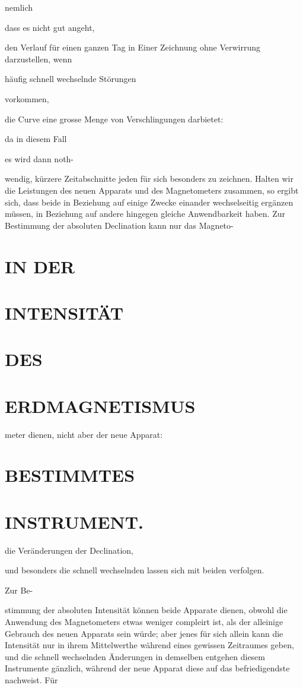 \documentclass[12pt,a4paper]{article}
\begin{document}
nemlich

dass es nicht gut angeht,

den Verlauf für einen ganzen Tag in Einer Zeichnung ohne Verwirrung darzustellen, wenn

häufig schnell wechselnde Störungen

vorkommen,

die Curve eine grosse Menge von Verschlingungen darbietet:

da in diesem Fall

es wird dann noth-

wendig, kürzere Zeitabschnitte jeden für sich besonders zu zeichnen. Halten wir die Leistungen des neuen Apparats und des Magnetometers zusammen, so ergibt sich, dass beide in Beziehung auf einige Zwecke einander wechselseitig ergänzen müssen, in Beziehung auf andere hingegen gleiche Anwendbarkeit haben. Zur Bestimmung der absoluten Declination kann nur das Magneto-

\section*{IN DER}
\section*{INTENSITÄT}
\section*{DES}
\section*{ERDMAGNETISMUS}
meter dienen, nicht aber der neue Apparat:

\section*{BESTIMMTES}
\section*{INSTRUMENT.}
die Veränderungen der Declination,

und besonders die schnell wechselnden lassen sich mit beiden verfolgen.

Zur Be-

stimmung der absoluten Intensität können beide Apparate dienen, obwohl die Anwendung des Magnetometers etwas weniger compleirt ist, als der alleinige Gebrauch des neuen Apparats sein würde; aber jenes für sich allein kann die Intensität nur in ihrem Mittelwerthe während eines gewissen Zeitraumes geben, und die schnell wechselnden Änderungen in demselben entgehen diesem Instrumente gänzlich, während der neue Apparat diese auf das befriedigendste nachweist. Für
\end{document}
